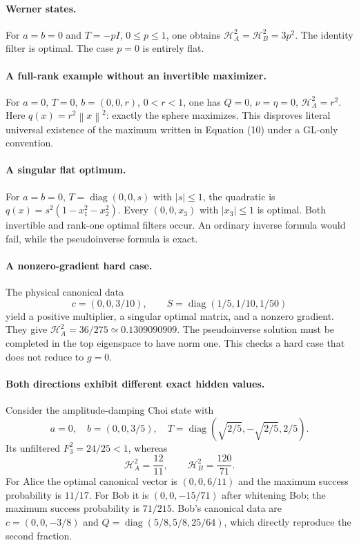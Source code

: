 \documentclass[11pt]{article}
\theoremstyle{remark}\newtheorem{remark}[theorem]{Remark}
\newcommand{\diag}{\operatorname{diag}}
\newcommand{\HF}{\mathcal H}
\newcommand{\norm}[1]{\left\lVert#1\right\rVert}
\begin{document}
\paragraph{Werner states.}
For $a=b=0$ and $T=-pI$, $0\leq p\leq1$, one obtains
$\HF_A^2=\HF_B^2=3p^2$. The identity filter is optimal. The case $p=0$
is entirely flat.

\paragraph{A full-rank example without an invertible maximizer.}
For $a=0$, $T=0$, $b=(0,0,r)$, $0<r<1$, one has $Q=0$, $\nu=\eta=0$,
$\HF_A^2=r^2$. Here $q(x)=r^2\norm x^2$: exactly the sphere maximizes.
This disproves literal universal existence of the maximum written in
Equation (10) under a GL-only convention.

\paragraph{A singular flat optimum.}
For $a=b=0$, $T=\diag(0,0,s)$ with $|s|\leq1$, the quadratic is
$q(x)=s^2(1-x_1^2-x_2^2)$. Every $(0,0,x_3)$ with $|x_3|\leq1$ is
optimal. Both invertible and rank-one optimal filters occur. An ordinary
inverse formula would fail, while the pseudoinverse formula is exact.

\paragraph{A nonzero-gradient hard case.}
The physical canonical data
\[c=(0,0,3/10),\qquad S=\diag(1/5,1/10,1/50)\]
yield a positive multiplier, a singular optimal
matrix, and a nonzero gradient. They give
$\HF_A^2=36/275\simeq0.1309090909$. The pseudoinverse solution must be
completed in the top eigenspace to have norm one. This checks a hard case
that does not reduce to $g=0$.

\paragraph{Both directions exhibit different exact hidden values.}
Consider the amplitude-damping Choi state with
\[
 a=0,\quad b=(0,0,3/5),\quad
 T=\diag(\sqrt{2/5},-\sqrt{2/5},2/5).
\]
Its unfiltered $F_3^2=24/25<1$, whereas
\begin{equation}\label{eq:asymmetricexample}
 \HF_A^2=\frac{12}{11},\qquad\HF_B^2=\frac{120}{71}.
\end{equation}
For Alice the optimal canonical vector is $(0,0,6/11)$ and the maximum
success probability is $11/17$. For Bob it is $(0,0,-15/71)$ after
whitening Bob; the maximum success probability is $71/215$. Bob's canonical
data are $c=(0,0,-3/8)$ and
$Q=\diag(5/8,5/8,25/64)$, which directly reproduce the second fraction.
\end{document}
